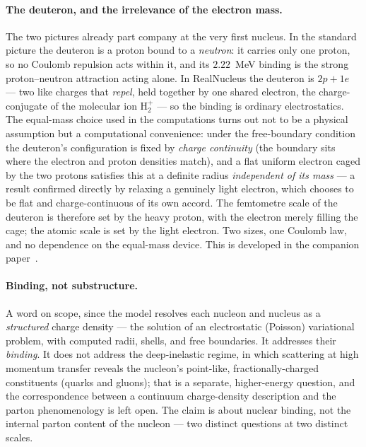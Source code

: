 \documentclass[11pt]{article}
\begin{document}
\paragraph{The deuteron, and the irrelevance of the electron mass.}
The two pictures already part company at the very first nucleus. In the standard picture the deuteron
is a proton bound to a \emph{neutron}: it carries only one proton, so no Coulomb repulsion acts within
it, and its $2.22$~MeV binding is the strong proton--neutron attraction acting alone. In RealNucleus the
deuteron is $2p+1e$ --- two like charges that \emph{repel}, held together by one shared electron, the
charge-conjugate of the molecular ion $\mathrm{H}_2^{+}$ --- so the binding is ordinary electrostatics.
The equal-mass choice used in the computations turns out not to be a physical assumption but a
computational convenience: under the free-boundary condition the deuteron's configuration is fixed by
\emph{charge continuity} (the boundary sits where the electron and proton densities match), and a flat
uniform electron caged by the two protons satisfies this at a definite radius \emph{independent of its
mass} --- a result confirmed directly by relaxing a genuinely light electron, which chooses to be flat
and charge-continuous of its own accord. The femtometre scale of the deuteron is therefore set by the
heavy proton, with the electron merely filling the cage; the atomic scale is set by the light electron.
Two sizes, one Coulomb law, and no dependence on the equal-mass device. This is developed in the
companion paper~\cite{RealNucleus}.

\paragraph{Binding, not substructure.}
A word on scope, since the model resolves each nucleon and nucleus as a \emph{structured} charge density
--- the solution of an electrostatic (Poisson) variational problem, with computed radii, shells, and
free boundaries. It addresses their \emph{binding}. It does not address the deep-inelastic regime, in
which scattering at high momentum transfer reveals the nucleon's point-like, fractionally-charged
constituents (quarks and gluons); that is a separate, higher-energy question, and the correspondence
between a continuum charge-density description and the parton phenomenology is left open. The claim is
about nuclear binding, not the internal parton content of the nucleon --- two distinct questions at two
distinct scales.
\end{document}
